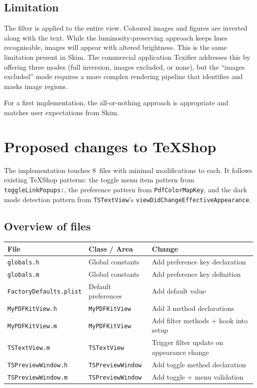 \documentclass[11pt,a4paper]{article}
\begin{document}
\subsection{Limitation}

The filter is applied to the entire view. Coloured images and figures are
inverted along with the text. While the luminosity-preserving approach keeps
hues recognisable, images will appear with altered brightness. This is the same
limitation present in Skim. The commercial application Texifier addresses this
by offering three modes (full inversion, images excluded, or none), but the
``images excluded'' mode requires a more complex rendering pipeline that
identifies and masks image regions.

For a first implementation, the all-or-nothing approach is appropriate and
matches user expectations from Skim.

\section{Proposed changes to TeXShop}

The implementation touches 8~files with minimal modifications to each. It
follows existing TeXShop patterns: the toggle menu item pattern from
\texttt{toggleLinkPopups:}, the preference pattern from \texttt{PdfColorMapKey},
and the dark mode detection pattern from \texttt{TSTextView}'s
\texttt{viewDidChangeEffectiveAppearance}.

\subsection{Overview of files}

\begin{table}[ht]
\centering
\small
\begin{tabular}{@{}lll@{}}
\toprule
\textbf{File} & \textbf{Class / Area} & \textbf{Change} \\
\midrule
\texttt{globals.h}           & Global constants     & Add preference key declaration \\
\texttt{globals.m}           & Global constants     & Add preference key definition \\
\texttt{FactoryDefaults.plist} & Default preferences & Add default value \\
\texttt{MyPDFKitView.h}      & \texttt{MyPDFKitView} & Add 3 method declarations \\
\texttt{MyPDFKitView.m}      & \texttt{MyPDFKitView} & Add filter methods + hook into setup \\
\texttt{TSTextView.m}        & \texttt{TSTextView}  & Trigger filter update on appearance change \\
\texttt{TSPreviewWindow.h}   & \texttt{TSPreviewWindow} & Add toggle method declaration \\
\texttt{TSPreviewWindow.m}   & \texttt{TSPreviewWindow} & Add toggle + menu validation \\
\bottomrule
\end{tabular}
\end{table}
\end{document}
